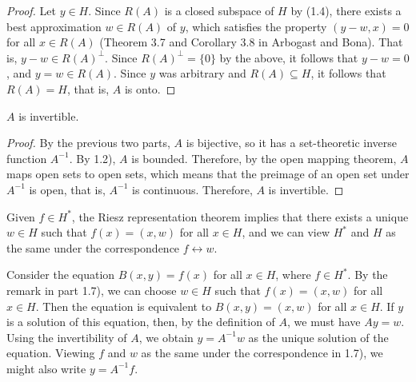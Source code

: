 \documentclass{homework}
\begin{document}
\begin{arabicparts}
\begin{proof}
			Let $y \in H$. Since $R(A)$ is a closed subspace of $H$ by (1.4), there exists a best approximation $w \in R(A)$ of $y$, which satisfies the property $(y - w, x) = 0$ for all $x \in R(A)$ (Theorem 3.7 and Corollary 3.8 in Arbogast and Bona). That is, $y-w \in R(A)^\perp$. Since $R(A)^\perp =\{0\}$ by the above, it follows that $y-w = 0$, and $y=w \in R(A)$. Since $y$ was arbitrary and $R(A) \subseteq H$, it follows that $R(A) = H$, that is, $A$  is onto.
		\end{proof}
		
		\questionpart
		$A$ is invertible.
		\begin{proof}
			By the previous two parts, $A$ is bijective, so it has a set-theoretic inverse function $A^{-1}$. By 1.2), $A$ is bounded. Therefore, by the open mapping theorem, $A$ maps open sets to open sets, which means that the preimage of an open set under $A^{-1}$ is open, that is, $A^{-1}$ is continuous. Therefore, $A$ is invertible.
		\end{proof}
		
		\questionpart
		Given $f \in H^{*}$, the Riesz representation theorem implies that there exists a unique $w \in H$ such that $f(x) = (x,w)$ for all $x \in H$, and we can view $H^{*}$ and $H$ as the same under the correspondence $f \leftrightarrow w$.
		
		\questionpart
		Consider the equation $B(x,y) = f(x)$ for all $x \in H$, where $f \in H^{*}$. By the remark in part 1.7), we can choose $w \in H$ such that $f(x) = (x,w)$ for all $x \in H$. Then the equation is equivalent to $B(x,y) = (x,w)$ for all $x \in H$. If $y$ is a solution of this equation, then, by the definition of $A$, we must have $Ay = w$. Using the invertibility of $A$, we obtain $y = A^{-1}w$ as the unique solution of the equation. Viewing $f$ and $w$ as the same under the correspondence in 1.7), we might also write $y = A^{-1}f$.
	\end{arabicparts}
	
	\question
\end{document}

